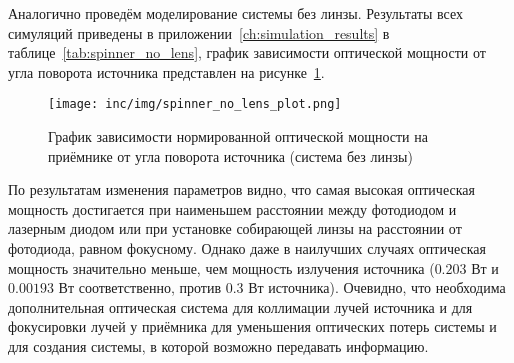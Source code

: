 Аналогично проведём моделирование системы без линзы. Результаты всех симуляций приведены в приложении~\ref{ch:simulation_results} в таблице~\ref{tab:spinner_no_lens}, график зависимости оптической мощности от угла поворота источника представлен на рисунке~\ref{fig:spinner_no_lens_plot}.

\begin{figure}[!h]
    \centering
    \texttt{[image: inc/img/spinner\_no\_lens\_plot.png]}
    \caption{График зависимости нормированной оптической мощности на приёмнике от угла поворота источника (система без линзы)}
    \label{fig:spinner_no_lens_plot}
\end{figure}

По результатам изменения параметров видно, что самая высокая оптическая мощность достигается при наименьшем расстоянии между фотодиодом и лазерным диодом или при установке собирающей линзы на расстоянии от фотодиода, равном фокусному. Однако даже в наилучших случаях оптическая мощность значительно меньше, чем мощность излучения источника ($0.203$ Вт и $0.00193$ Вт соответственно, против $0.3$ Вт источника). Очевидно, что необходима дополнительная оптическая система для коллимации лучей источника и для фокусировки лучей у приёмника для уменьшения оптических потерь системы и для создания системы, в которой возможно передавать информацию.